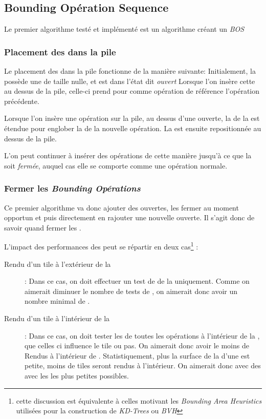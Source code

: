 		\subsection{Bounding Opération Sequence}
			Le premier algorithme testé et implémenté est un algorithme créant un \emph{BOS}
			
			\subsubsection{Placement des \BO dans la pile}
			Le placement des \BO dans la pile fonctionne de la manière suivante: Initialement, la \BO possède une \BB
			de taille nulle, et est dans l'état dit \emph{ouvert} Lorsque l'on insère cette \BO au dessus de la pile, 
			celle-ci prend pour comme opération de référence l'opération précédente. 

			Lorsque l'on insère une opération sur la pile, au dessus d'une \BO ouverte, la \BB de la \BO est étendue
			pour englober la \BB de la nouvelle opération. La \BB est ensuite repositionnée au dessus de la pile. 

			L'on peut continuer à insérer des opérations de cette manière jusqu'à ce que la \BO soit \emph{fermée},
			auquel cas elle se comporte comme une opération normale. 

			\subsubsection{Fermer les \emph{Bounding Opérations}}
			Ce premier algorithme va donc ajouter des \BO ouvertes, les fermer au moment opportun et puis directement 
			en rajouter une nouvelle ouverte. Il s'agit donc de savoir quand fermer les \BO.

			L'impact des performances des \BO peut se répartir en deux cas\footnote{cette discussion est équivalente à celles motivant les \emph{Bounding Area Heuristics} utilisées pour la construction de \emph{KD-Trees} ou \emph{BVH}\cite{havran}} :
			\begin{description}
				\item[Rendu d'un tile à l'extérieur de la \BO]: Dans ce cas, on doit effectuer un test de \BB de la \BO
				uniquement. Comme on aimerait diminuer le nombre de tests de \BB, on aimerait donc avoir un nombre minimal
				de \BO.
				\item[Rendu d'un tile à l'intérieur de la \BB]: Dans ce cas, on doit tester les \BB de toutes les 
				opérations à l'intérieur de la \BO, que celles ci influence le tile ou pas. On aimerait donc avoir le moins
				de Rendus à l'intérieur de \BO. Statistiquement, plus la surface de la \BB d'une \BO est petite, moins de
				tiles seront rendus à l'intérieur. On aimerait donc avec des \BO avec les \BB les plus petites possibles.
			\end{description}
			

